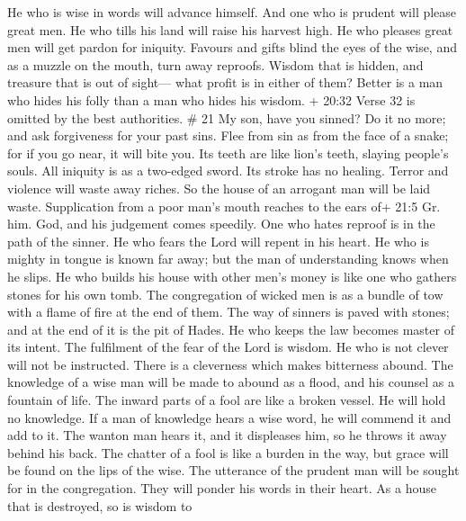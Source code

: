  He who is wise in words will advance himself. And one who
is prudent will please great men.  He who tills his land
will raise his harvest high. He who pleases great men will get pardon
for iniquity.  Favours and gifts blind the eyes of the
wise, and as a muzzle on the mouth, turn away reproofs. 
Wisdom that is hidden, and treasure that is out of sight--- what profit
is in either of them?  Better is a man who hides his folly
than a man who hides his wisdom.  + 20:32 Verse 32 is
omitted by the best authorities. \# 21  My son, have you
sinned? Do it no more; and ask forgiveness for your past sins.
 Flee from sin as from the face of a snake; for if you go
near, it will bite you. Its teeth are like lion's teeth, slaying
people's souls.  All iniquity is as a two-edged sword. Its
stroke has no healing.  Terror and violence will waste away
riches. So the house of an arrogant man will be laid waste. 
Supplication from a poor man's mouth reaches to the ears of+ 21:5 Gr.
him. God, and his judgement comes speedily.  One who hates
reproof is in the path of the sinner. He who fears the Lord will repent
in his heart.  He who is mighty in tongue is known far away;
but the man of understanding knows when he slips.  He who
builds his house with other men's money is like one who gathers stones
for his own tomb.  The congregation of wicked men is as a
bundle of tow with a flame of fire at the end of them.  The
way of sinners is paved with stones; and at the end of it is the pit of
Hades.  He who keeps the law becomes master of its intent.
The fulfilment of the fear of the Lord is wisdom.  He who
is not clever will not be instructed. There is a cleverness which makes
bitterness abound.  The knowledge of a wise man will be
made to abound as a flood, and his counsel as a fountain of life.
 The inward parts of a fool are like a broken vessel. He
will hold no knowledge.  If a man of knowledge hears a wise
word, he will commend it and add to it. The wanton man hears it, and it
displeases him, so he throws it away behind his back.  The
chatter of a fool is like a burden in the way, but grace will be found
on the lips of the wise.  The utterance of the prudent man
will be sought for in the congregation. They will ponder his words in
their heart.  As a house that is destroyed, so is wisdom to
